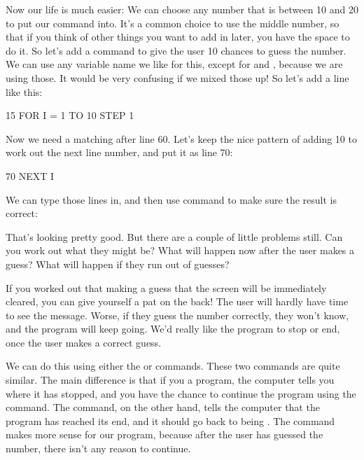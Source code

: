 
\needspace{3cm}
Now our life is much easier: We can choose any  number that is between
10 and 20 to put our  command into.  It's a common choice to
use the middle number, so that if you think of other things you want
to add in later, you have the space to do it.  So let's add a
 command to give the user 10 chances to guess the number.  We
can use any variable name we like for this, except for  and
, because we are using those. It would be very confusing if we
mixed those up!  So let's add a line like this:

\begin{screencode}
15 FOR I = 1 TO 10 STEP 1
\end{screencode}

\needspace{3cm}
Now we need a matching  after line 60.  Let's keep the
nice pattern of adding 10 to work out the next line number, and put it
as line 70:

\begin{screencode}
70 NEXT I
\end{screencode}

\needspace{4cm}
We can type those lines in, and then use  command to make
sure the result is correct:


That's looking pretty good.  But there are a couple of little problems still.
Can you work out what they might be? What will happen now after the user makes a guess?
What will happen if they run out of guesses?

If you worked out that making a guess that the screen will be
immediately cleared, you can give yourself a pat on the back! The user
will hardly have time to see the message. Worse, if they guess the
number correctly, they won't know, and the program will keep going.
We'd really like the program to stop or end, once the user makes a
correct guess.

We can do this using either the  or
 commands.  These two commands are quite similar.  The main
difference is that if you  a program, the computer tells
you where it has stopped, and you have the chance to continue the
program using the  command.  The  command, on the
other hand, tells the computer that the program has reached its end,
and it should go back to being .  The  command
makes more sense for our program, because after the user has guessed
the number, there isn't any reason to continue.

